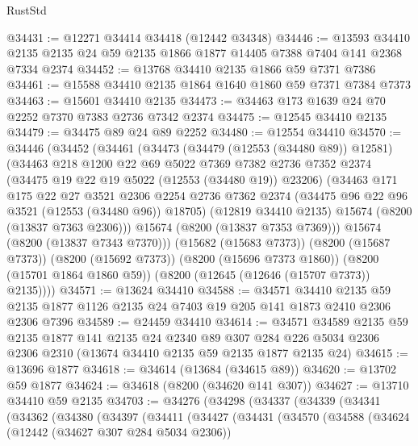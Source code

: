 \begin{lexlean}{RustStd}
\begin{coremodule}
@34431 := @12271 @34414 @34418 (@12442 @34348)
@34446 := @13593
    @34410
    @2135
    @2135
    @24
    @59
    @2135
    @1866
    @1877
    @14405
    @7388
    @7404
    @141
    @2368
    @7334
    @2374
@34452 := @13768 @34410 @2135 @1866 @59 @7371 @7386
@34461 := @15588 @34410 @2135 @1864 @1640 @1860 @59 @7371 @7384 @7373
@34463 := @15601 @34410 @2135
@34473 := @34463 @173 @1639 @24 @70 @2252 @7370 @7383 @2736 @7342 @2374
@34475 := @12545 @34410 @2135
@34479 := @34475 @89 @24 @89 @2252
@34480 := @12554 @34410
@34570 := @34446
    (@34452
      (@34461
        (@34473
          (@34479 (@12553 (@34480 @89)) @12581)
          (@34463
            @218
            @1200
            @22
            @69
            @5022
            @7369
            @7382
            @2736
            @7352
            @2374
            (@34475 @19 @22 @19 @5022 (@12553 (@34480 @19)) @23206)
            (@34463
              @171
              @175
              @22
              @27
              @3521
              @2306
              @2254
              @2736
              @7362
              @2374
              (@34475 @96 @22 @96 @3521 (@12553 (@34480 @96)) @18705)
              (@12819 @34410 @2135)
              @15674
              (@8200 (@13837 @7363 @2306)))
            @15674
            (@8200 (@13837 @7353 @7369)))
          @15674
          (@8200 (@13837 @7343 @7370)))
        (@15682 (@15683 @7373))
        (@8200 (@15687 @7373))
        (@8200 (@15692 @7373))
        (@8200 (@15696 @7373 @1860))
        (@8200 (@15701 @1864 @1860 @59))
        (@8200 (@12645 (@12646 (@15707 @7373)) @2135))))
@34571 := @13624 @34410
@34588 := @34571
    @34410
    @2135
    @59
    @2135
    @1877
    @1126
    @2135
    @24
    @7403
    @19
    @205
    @141
    @1873
    @2410
    @2306
    @2306
    @7396
@34589 := @24459 @34410
@34614 := @34571
    @34589
    @2135
    @59
    @2135
    @1877
    @141
    @2135
    @24
    @2340
    @89
    @307
    @284
    @226
    @5034
    @2306
    @2306
    @2310
    (@13674 @34410 @2135 @59 @2135 @1877 @2135 @24)
@34615 := @13696 @1877
@34618 := @34614 (@13684 (@34615 @89))
@34620 := @13702 @59 @1877
@34624 := @34618 (@8200 (@34620 @141 @307))
@34627 := @13710 @34410 @59 @2135
@34703 := @34276
    (@34298
      (@34337
        (@34339
          (@34341
            (@34362
              (@34380
                (@34397
                  (@34411
                    (@34427
                      (@34431
                        (@34570
                          (@34588
                            (@34624
                              (@12442 (@34627 @307 @284 @5034 @2306))

\end{coremodule}
\end{lexlean}
